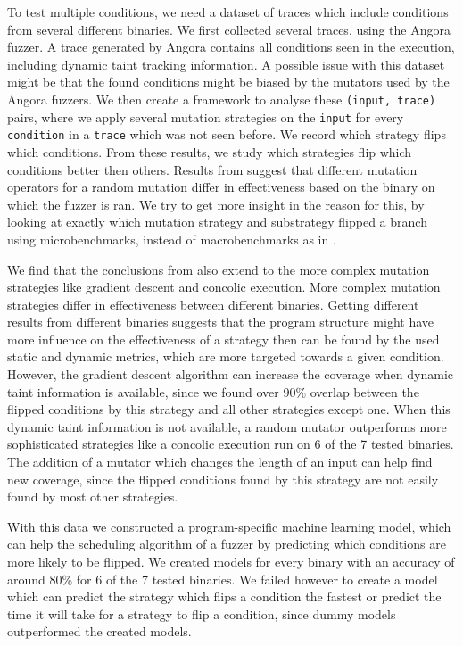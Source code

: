 To test multiple conditions, we need a dataset of traces which include conditions from several different binaries.
We first collected several traces, using the Angora fuzzer. A trace generated by Angora contains all conditions seen in the execution, including dynamic taint tracking information. A possible issue with this dataset might be that the found conditions might be biased by the mutators used by the Angora fuzzers. We then create a framework to analyse these \texttt{(input, trace)} pairs, where we apply several mutation strategies on the \texttt{input} for every \texttt{condition} in a \texttt{trace} which was not seen before. We record which strategy flips which conditions. From these results, we study which strategies flip which conditions better then others. Results from \cite{lyu2019mopt} suggest that different mutation operators for a random mutation differ in effectiveness based on the binary on which the fuzzer is ran. We try to get more insight in the reason for this, by looking at exactly which mutation strategy and substrategy flipped a branch using microbenchmarks, instead of macrobenchmarks as in \cite{klees2018evaluating}.

We find that the conclusions from \cite{lyu2019mopt} also extend to the more complex mutation strategies like gradient descent and concolic execution. More complex mutation strategies differ in effectiveness between different binaries. 
Getting different results from different binaries suggests that the program structure might have more influence on the effectiveness of a strategy then can be found by the used static and dynamic metrics, which are more targeted towards a given condition. However, the gradient descent algorithm can increase the coverage when dynamic taint information is available, since we found over 90\% overlap between the flipped conditions by this strategy and all other strategies except one. When this dynamic taint information is not available, a random mutator outperforms more sophisticated strategies like a concolic execution run on 6 of the 7 tested binaries. The addition of a mutator which changes the length of an input can help find new coverage, since the flipped conditions found by this strategy are not easily found by most other strategies.

With this data we constructed a program-specific machine learning model, which can help the scheduling algorithm of a fuzzer by predicting which conditions are more likely to be flipped. We created models for every binary with an accuracy of around 80\% for 6 of the 7 tested binaries.
We failed however to create a model which can predict the strategy which flips a condition the fastest or predict the time it will take for a strategy to flip a condition, since dummy models outperformed the created models.


